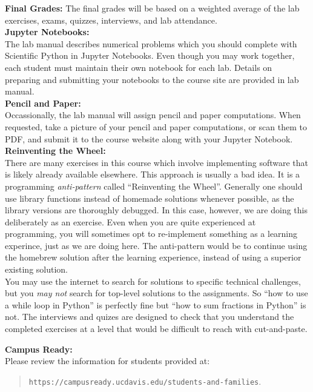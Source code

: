 \documentclass[12pt]{article}
\begin{document}
\noindent
\textbf{Final Grades:} The final grades will be based on a weighted
average of the lab exercises, exams, quizzes, interviews, and lab
attendance. \\

\noindent
\textbf {Jupyter Notebooks:}\\ 
The lab manual describes numerical problems which you should complete
with Scientific Python in Jupyter Notebooks.  Even though you may work
together, each student must maintain their own notebook for each lab.
Details on preparing and submitting your notebooks to the course site
are provided in lab manual.\\

\noindent
\textbf {Pencil and Paper:}\\ 
Occassionally, the lab manual will assign pencil and paper
computations.  When requested, take a picture of your pencil and
paper computations, or scan them to PDF, and submit it to the course website along
with your Jupyter Notebook.\\


\noindent
\textbf {Reinventing the Wheel:}\\
There are many exercises in this course which involve implementing
software that is likely already available elsewhere.  This approach
is usually a bad idea.  It is a programming {\em anti-pattern} called
``Reinventing the Wheel''.  Generally one should use library functions
instead of homemade solutions whenever possible, as the library
versions are thoroughly debugged.  In this case, however, we are doing
this deliberately as an exercise.  Even when you are quite experienced
at programming, you will sometimes opt to re-implement something as a
learning experince, just as we are doing here.  The anti-pattern would
be to continue using the homebrew solution after the learning
experience, instead of using a superior existing solution.\\

\noindent
You may use the internet to search for solutions to specific technical
challenges, but you {\em may not} search for top-level solutions to
the assignments.  So ``how to use a while loop in Python'' is
perfectly fine but ``how to sum fractions in Python'' is not.  The
interviews and quizes are designed to check that you understand the
completed exercises at a level that would be difficult to reach with
cut-and-paste.\\


\newpage

\noindent \textbf{Campus Ready:}\\ 
Please review the information for students provided at:
\begin{quote}
{\tt https://campusready.ucdavis.edu/students-and-families}.\\
\end{quote}
\end{document}
